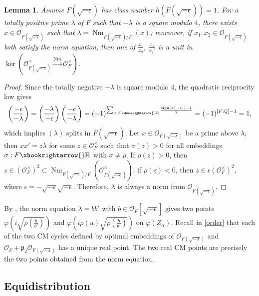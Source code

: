 \documentclass{amsart}
\numberwithin{equation}{subsection}
\numberwithin{theorem}{section}
\newtheorem{lemma}[theorem]{Lemma}
\theoremstyle{definition}
\theoremstyle{remark}
\newcommand{\bQ}{\mathbb{Q}}
\newcommand{\bR}{\mathbb{R}}
\newcommand{\cO}{\mathcal{O}}
\newcommand{\fp}{\mathfrak{p}}
\DeclareMathOperator{\Nm}{Nm}
\DeclareMathOperator{\sign}{sign}
\begin{document}
\begin{lemma}\label{lem:CMgeo}
    Assume $F(\sqrt{-\epsilon})$ has class number $h(F(\sqrt{-\epsilon})) = 1$. For a totally positive prime $\lambda$ of $F$ such that $-\lambda$ is a square modulo $4$, there exists $x\in \cO_{F(\sqrt{-\epsilon})}$ such that $\lambda = \Nm_{F(\sqrt{-\epsilon})/F}(x)$; moreover, if $x_1, x_2\in \cO_{F(\sqrt{-\epsilon})}$ both satisfy the norm equation, then one of  $\frac{x_1}{x_2}$, $\frac{x_1}{x_2'}$ is a unit in $\ker(\mathcal{O}_{F(\sqrt{-\epsilon})}^\times \xrightarrow{\Nm} \mathcal{O}_F^\times)$. 
\end{lemma}
\begin{proof}
    Since the totally negative $-\lambda$ is square modulo $4$, the quadratic reciprocity law gives \[\left(\frac{-\epsilon}{-\lambda}\right) = \left(\frac{-\lambda}{-\epsilon}\right)\left(\frac{-\epsilon}{-\lambda}\right) = (-1)^{\sum_{\sigma:F\xhookrightarrow{}\bR} \frac{\sign(\sigma(-\epsilon))-1}{2}} =(-1)^{[F:\bQ]-1} = 1,\] which implies $(\lambda)$ splits in $F(\sqrt{-\epsilon})$. Let $x\in \cO_{F(\sqrt{-\lambda})}$ be a prime above $\lambda$, then $xx' = z \lambda$ for some $z\in \cO_F^\times$ such that $\sigma(z) > 0$ for all embeddings $\sigma:F\xhookrightarrow{}\bR$ with $\sigma\neq \rho$. If $\rho(z) > 0$, then $z \in (\cO_F^\times)^2\subset \Nm_{F(\sqrt{-\epsilon})/F}(\cO_{F(\sqrt{-\epsilon})}^\times)$; if $\rho(z) < 0$, then $z \in \epsilon (\cO_F^\times)^2$, where $\epsilon = -\sqrt{-\epsilon}\sqrt{-\epsilon}$. Therefore, $\lambda$ is always a norm from $\cO_{F(\sqrt{-\epsilon})}$. 
\end{proof}

By , the norm equation $\lambda = bb'$ with $b\in \mathcal{O}_F[\sqrt{-\epsilon}]$ gives two points $\varphi\left(i\sqrt{\rho\left(\frac{b}{b'}\right)}\right)$ and $\varphi\left(i\rho(u)\sqrt{\rho\left(\frac{b}{b'}\right)}\right)$ on $\varphi(Z_{\alpha})$. Recall in  \cref{order} that each of the two CM cycles  defined by optimal embeddings of $\cO_{F(\sqrt{-\lambda})}$ and $\cO_{F}+\fp_2\cO_{F(\sqrt{-\lambda})}$ has a unique real point.
The two real CM points are precisely the two points obtained from the norm equation. 

\subsection{Equidistribution} \label{sec:equidis}
\end{document}
